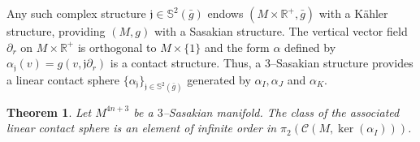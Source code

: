 \documentclass[10pt]{amsart}
\newtheorem{theorem}[proposition]{Theorem}
\begin{document}
\noindent Any such complex structure ${\mathfrak{j}}\in{\mathbb{S}}^2(\bar{g})$ endows $(M\times{\mathbb{R}}^+,\bar{g})$ with a K\"ahler structure, providing $(M,g)$ with a Sasakian structure. The vertical vector field $\partial_r$ on $M\times{\mathbb{R}}^+$ is orthogonal to $M\times\{1\}$ and the form $\alpha$ defined by $\alpha_{\mathfrak{j}}(v)=g(v,{\mathfrak{j}}\partial_r)$ is a contact structure. Thus, a $3$--Sasakian structure provides a linear contact sphere $\{\alpha_{\mathfrak{j}}\}_{{\mathfrak{j}}\in{\mathbb{S}}^2(\bar{g})}$ generated by $\alpha_I,\alpha_J$ and $\alpha_K$.

\begin{theorem}\label{thm:linSas}
Let $M^{4n+3}$ be a $3$--Sasakian manifold. The class of the associated linear contact sphere is an element of infinite order in $\pi_2({\mathcal{C}}(M,\ker(\alpha_I)))$.
\end{theorem}
\end{document}
